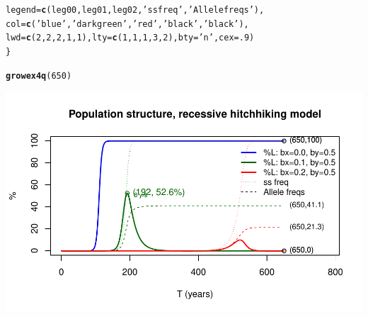 \documentclass{article}\usepackage[]{graphicx}\usepackage[]{color}
\makeatletter
\def\maxwidth{ %
  \ifdim\Gin@nat@width>\linewidth
    \linewidth
  \else
    \Gin@nat@width
  \fi
}
\newcommand{\hlnum}[1]{\textcolor[rgb]{0.686,0.059,0.569}{#1}}%
\newcommand{\hlstr}[1]{\textcolor[rgb]{0.192,0.494,0.8}{#1}}%
\newcommand{\hlstd}[1]{\textcolor[rgb]{0.345,0.345,0.345}{#1}}%
\newcommand{\hlkwc}[1]{\textcolor[rgb]{0.333,0.667,0.333}{#1}}%
\newcommand{\hlkwd}[1]{\textcolor[rgb]{0.737,0.353,0.396}{\textbf{#1}}}%
\newenvironment{kframe}{%
 \def\at@end@of@kframe{}%
 \ifinner\ifhmode%
  \def\at@end@of@kframe{\end{minipage}}%
  \begin{minipage}{\columnwidth}%
 \fi\fi%
 \def\FrameCommand##1{\hskip\@totalleftmargin \hskip-\fboxsep
 \colorbox{shadecolor}{##1}\hskip-\fboxsep
     \hskip-\linewidth \hskip-\@totalleftmargin \hskip\columnwidth}%
 \MakeFramed {\advance\hsize-\width
   \@totalleftmargin\z@ \linewidth\hsize
   \@setminipage}}%
 {\par\unskip\endMakeFramed%
 \at@end@of@kframe}
\newenvironment{knitrout}{}{} %
\makeatother
\begin{document}
\begin{knitrout}
\begin{kframe}
\begin{alltt}
         \hlkwc{legend}\hlstd{=}\hlkwd{c}\hlstd{(leg00,  leg01,       leg02,} \hlstr{'ss freq'}\hlstd{,} \hlstr{'Allele freqs'}\hlstd{),}
         \hlkwc{col}\hlstd{=}   \hlkwd{c}\hlstd{(}\hlstr{'blue'}\hlstd{,} \hlstr{'darkgreen'}\hlstd{,} \hlstr{'red'}\hlstd{,} \hlstr{'black'}\hlstd{,}   \hlstr{'black'}\hlstd{),}
         \hlkwc{lwd}\hlstd{=}\hlkwd{c}\hlstd{(}\hlnum{2}\hlstd{,}\hlnum{2}\hlstd{,}\hlnum{2}\hlstd{,}\hlnum{1}\hlstd{,}\hlnum{1}\hlstd{),} \hlkwc{lty}\hlstd{=}\hlkwd{c}\hlstd{(}\hlnum{1}\hlstd{,}\hlnum{1}\hlstd{,}\hlnum{1}\hlstd{,}\hlnum{3}\hlstd{,}\hlnum{2}\hlstd{),} \hlkwc{bty}\hlstd{=}\hlstr{'n'}\hlstd{,} \hlkwc{cex}\hlstd{=}\hlnum{.9}\hlstd{)}
\hlstd{\}}
\end{alltt}
\end{kframe}
\end{knitrout}

\begin{knitrout}\footnotesize
{}\color{fgcolor}\begin{kframe}
\begin{alltt}
\hlkwd{growex4q}\hlstd{(}\hlnum{650}\hlstd{)}
\end{alltt}
\end{kframe}

{\centering \includegraphics[width=\maxwidth]{asex-figs-knitr/recessive-hitch-1} 

}



\end{knitrout}
\end{document}
